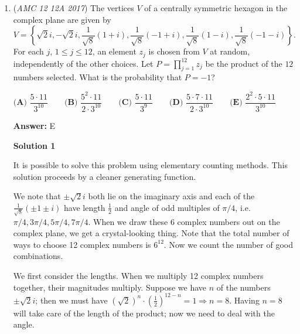 \begin{enumerate}
 \[XF \cdot XG = \frac{51}{3} = \boxed{\textbf{(A) } 17}\]




\textbf{Solution 5 (cheese)}

We can find the length of $\overline{BD}$ as in the previous solutions, with the Law of Cosines. Once we do this, we find $\overline{BD}=\sqrt{51}$. Now, note that answer choice $\textbf{(A)}$ is the only answer that seems to be related to this length, so  the best guess is $\boxed{\textbf{(A) 17}}$



	\item (\textit{AMC 12 12A 2017}) The vertices $V$ of a centrally symmetric hexagon in the complex plane are given by 
 \[V=\left\{   \sqrt{2}i,-\sqrt{2}i, \frac{1}{\sqrt{8}}(1+i),\frac{1}{\sqrt{8}}(-1+i),\frac{1}{\sqrt{8}}(1-i),\frac{1}{\sqrt{8}}(-1-i) \right\}.\] For each $j$, $1\leq j\leq 12$, an element $z_j$ is chosen from $V$ at random, independently of the other choices. Let $P={\prod}_{j=1}^{12}z_j$ be the product of the $12$ numbers selected. What is the probability that $P=-1$?


 $\textbf{(A) } \dfrac{5\cdot11}{3^{10}} \qquad \textbf{(B) } \dfrac{5^2\cdot11}{2\cdot3^{10}} \qquad \textbf{(C) } \dfrac{5\cdot11}{3^{9}} \qquad \textbf{(D) } \dfrac{5\cdot7\cdot11}{2\cdot3^{10}} \qquad \textbf{(E) } \dfrac{2^2\cdot5\cdot11}{3^{10}}$

 \textbf{Answer: }E



\textbf{Solution 1}

It is possible to solve this problem using elementary counting methods. This solution proceeds by a cleaner generating function.

 We note that $\pm \sqrt{2}i$ both lie on the imaginary axis and each of the $\frac{1}{\sqrt{8}}(\pm 1\pm i)$ have length $\frac{1}{2}$ and angle of odd multiples of $\pi/4$, i.e. $\pi/4,3\pi/4,5\pi/4,7\pi/4$. When we draw these 6 complex numbers out on the complex plane, we get a crystal-looking thing. Note that the total number of ways to choose 12 complex numbers is $6^{12}$. Now we count the number of good combinations.

 We first consider the lengths. When we multiply 12 complex numbers together, their magnitudes multiply. Suppose we have $n$ of the numbers $\pm \sqrt{2}i$; then we must have $\left(\sqrt{2}\right)^n\cdot\left(\frac{1}{2}\right)^{12-n}=1 \Longrightarrow n=8$. Having $n=8$ will take care of the length of the product; now we need to deal with the angle.


\end{enumerate}
